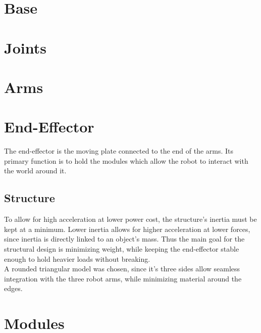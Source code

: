 \section{Base}


\section{Joints}


\section{Arms}


\section{End-Effector}
The end-effector is the moving plate connected to the end of the arms. Its primary function is to hold the modules which allow the robot to interact with the world around it.

\subsection{Structure}
To allow for high acceleration at lower power cost, the structure's inertia must be kept at a minimum.
Lower inertia allows for higher acceleration at lower forces, since inertia is directly linked to an object's mass.
Thus the main goal for the structural design is minimizing weight, while keeping the end-effector stable enough to hold heavier loads without breaking. \\
A rounded triangular model was chosen, since it's three sides allow seamless integration with the three robot arms, while minimizing material around the edges.


\section{Modules}
